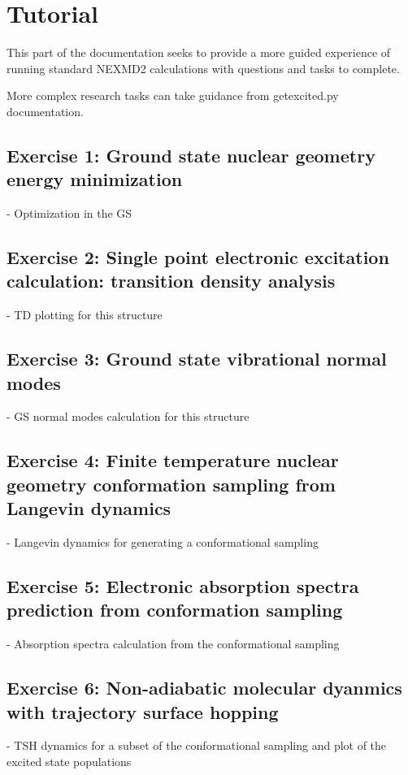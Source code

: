 \section{Tutorial}

This part of the documentation seeks to provide a more guided experience of running 
standard NEXMD2 calculations with questions and tasks to complete.

More complex research tasks can take guidance from getexcited.py documentation.

\subsection{Exercise 1: Ground state nuclear geometry energy minimization}
- Optimization in the GS

\subsection{Exercise 2: Single point electronic excitation calculation: transition density analysis}
- TD plotting for this structure

\subsection{Exercise 3: Ground state vibrational normal modes}
- GS normal modes calculation for this structure

\subsection{Exercise 4: Finite temperature nuclear geometry conformation sampling from Langevin dynamics}
- Langevin dynamics for generating a conformational sampling

\subsection{Exercise 5: Electronic absorption spectra prediction from conformation sampling}
- Absorption spectra calculation from the conformational sampling

\subsection{Exercise 6: Non-adiabatic molecular dyanmics with trajectory surface hopping}
- TSH dynamics for a subset of the conformational sampling and plot of the excited state populations